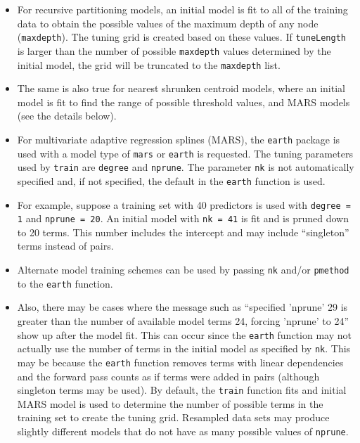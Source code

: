 \documentclass[12pt]{article}
\begin{document}
\begin{itemize}
	\item For recursive partitioning models, an initial model is fit to all of the training data to obtain the possible values of the maximum depth of any node (\texttt{maxdepth}). The tuning grid is created based on these values. If \texttt{tuneLength} is larger than the number of possible \texttt{maxdepth} values determined by the initial model, the grid will be truncated to the  \texttt{maxdepth} list.
	
	\item [] The same is also true for nearest shrunken centroid models, where an initial model is fit to find the range of possible threshold values, and MARS models (see the details below).
	
  \item For multivariate adaptive regression splines (MARS), the \texttt{earth} package is used with a model type of \texttt{mars} or \texttt{earth} is requested. The tuning parameters used by \texttt{train} are \texttt{degree} and \texttt{nprune}. The parameter \texttt{nk} is not automatically specified and, if not specified, the default in the \texttt{earth} function is used. 

  \item [] For example, suppose a training set with 40 predictors is used with \texttt{degree = 1} and \texttt{nprune = 20}. An initial model with \texttt{nk = 41} is fit and is pruned down to 20 terms. This number includes the intercept and may include ``singleton'' terms instead of pairs. 

  \item [] Alternate model training schemes can be used by passing \texttt{nk} and/or \texttt{pmethod} to the \texttt{earth} function.

  \item [] Also, there may be cases where the message such as ``specified 'nprune' 29 is greater than the number of available model terms 24, forcing 'nprune' to 24'' show up after the model fit. This can occur since the \texttt{earth} function may not actually use the number of terms in the initial model as specified by \texttt{nk}. This may be because the \texttt{earth} function removes terms with linear dependencies and  the forward pass counts as if terms were added in pairs (although singleton terms may be used). By default, the \texttt{train} function fits and initial MARS model is used to determine the number of possible terms in the training set to create the tuning grid. Resampled data sets may produce slightly different models that do not have as many possible values of  \texttt{nprune}.
	

\end{itemize}
\end{document}
